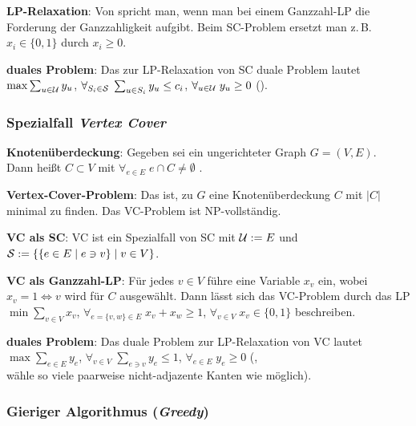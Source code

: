 \textbf{LP-Relaxation}:
Von  spricht man, wenn man bei einem Ganzzahl-LP die Forderung
der Ganzzahligkeit aufgibt.
Beim SC-Problem ersetzt man z.\,B. $x_i \in \{0, 1\}$ durch $x_i \ge 0$.

\textbf{duales Problem}:
Das zur LP-Relaxation von SC duale Problem lautet\\
$\max \sum_{u \in \U} y_u$, $\forall_{S_i \in \S}\; \sum_{u \in S_i} y_u \le c_i$,
$\forall_{u \in \U}\; y_u \ge 0$ ().

\subsubsection{%
    Spezialfall \emph{Vertex Cover}%
}

\textbf{Knotenüberdeckung}:
Gegeben sei ein ungerichteter Graph $G = (V, E)$.\\
Dann heißt $C \subset V$ mit $\forall_{e \in E}\; e \cap C \not= \emptyset$
.

\textbf{Vertex-Cover-Problem}:
Das  ist, zu $G$ eine Knotenüberdeckung $C$ mit $|C|$ minimal
zu finden.
Das VC-Problem ist NP-vollständig.

\textbf{VC als SC}:
VC ist ein Spezialfall von SC mit $\U := E$ und
$\S := \{\{e \in E \;|\; e \ni v\} \;|\; v \in V\}$.

\linie

\textbf{VC als Ganzzahl-LP}:
Für jedes $v \in V$ führe eine Variable $x_v$ ein, wobei $x_v = 1 \iff v$ wird für $C$
ausgewählt.
Dann lässt sich das VC-Problem durch das LP\\
$\min \sum_{v \in V} x_v$, $\forall_{e = \{v, w\} \in E}\; x_v + x_w \ge 1$,
$\forall_{v \in V}\; x_v \in \{0, 1\}$
beschreiben.

\textbf{duales Problem}:
Das duale Problem zur LP-Relaxation von VC lautet\\
$\max \sum_{e \in E} y_e$, $\forall_{v \in V}\; \sum_{e \ni v} y_e \le 1$,
$\forall_{e \in E}\; y_e \ge 0$ (,\\
wähle so viele paarweise nicht-adjazente Kanten wie möglich).

\pagebreak

\subsubsection{%
    Gieriger Algorithmus (\emph{Greedy})%
}

